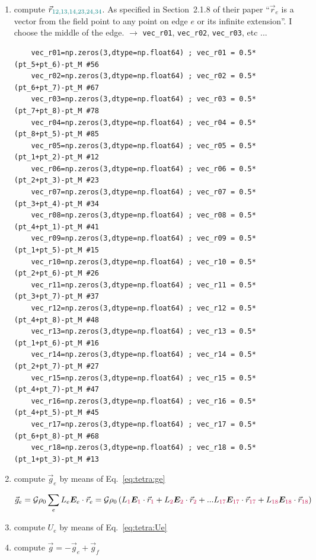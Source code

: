 \begin{enumerate}
\item compute $\vec{r}_{\color{teal}12,13,14,23,24,34}$. As specified in Section~2.1.8 of their
paper ``$\vec{r}_e$ is a vector from the field point to any point on edge $e$ or its infinite extension''. I choose the middle of the edge. $\rightarrow$ \verb|vec_r01|, \verb|vec_r02|, \verb|vec_r03|, etc ...
{\tiny
\begin{lstlisting}
    vec_r01=np.zeros(3,dtype=np.float64) ; vec_r01 = 0.5*(pt_5+pt_6)-pt_M #56 
    vec_r02=np.zeros(3,dtype=np.float64) ; vec_r02 = 0.5*(pt_6+pt_7)-pt_M #67
    vec_r03=np.zeros(3,dtype=np.float64) ; vec_r03 = 0.5*(pt_7+pt_8)-pt_M #78
    vec_r04=np.zeros(3,dtype=np.float64) ; vec_r04 = 0.5*(pt_8+pt_5)-pt_M #85
    vec_r05=np.zeros(3,dtype=np.float64) ; vec_r05 = 0.5*(pt_1+pt_2)-pt_M #12
    vec_r06=np.zeros(3,dtype=np.float64) ; vec_r06 = 0.5*(pt_2+pt_3)-pt_M #23
    vec_r07=np.zeros(3,dtype=np.float64) ; vec_r07 = 0.5*(pt_3+pt_4)-pt_M #34
    vec_r08=np.zeros(3,dtype=np.float64) ; vec_r08 = 0.5*(pt_4+pt_1)-pt_M #41
    vec_r09=np.zeros(3,dtype=np.float64) ; vec_r09 = 0.5*(pt_1+pt_5)-pt_M #15
    vec_r10=np.zeros(3,dtype=np.float64) ; vec_r10 = 0.5*(pt_2+pt_6)-pt_M #26
    vec_r11=np.zeros(3,dtype=np.float64) ; vec_r11 = 0.5*(pt_3+pt_7)-pt_M #37
    vec_r12=np.zeros(3,dtype=np.float64) ; vec_r12 = 0.5*(pt_4+pt_8)-pt_M #48
    vec_r13=np.zeros(3,dtype=np.float64) ; vec_r13 = 0.5*(pt_1+pt_6)-pt_M #16
    vec_r14=np.zeros(3,dtype=np.float64) ; vec_r14 = 0.5*(pt_2+pt_7)-pt_M #27
    vec_r15=np.zeros(3,dtype=np.float64) ; vec_r15 = 0.5*(pt_4+pt_7)-pt_M #47
    vec_r16=np.zeros(3,dtype=np.float64) ; vec_r16 = 0.5*(pt_4+pt_5)-pt_M #45
    vec_r17=np.zeros(3,dtype=np.float64) ; vec_r17 = 0.5*(pt_6+pt_8)-pt_M #68
    vec_r18=np.zeros(3,dtype=np.float64) ; vec_r18 = 0.5*(pt_1+pt_3)-pt_M #13
\end{lstlisting}
}




\item compute $\vec{g}_e$ by means of Eq.~\eqref{eq:tetra:ge}

\[
\vec{g}_e 
={\cal G} \rho_0 \sum_e L_e {\bm E}_e \cdot \vec{r}_e 
={\cal G} \rho_0 \left( 
L_{\color{purple}1} {\bm E}_{\color{purple}1}\cdot\vec{r}_{\color{purple}1} +
L_{\color{purple}2} {\bm E}_{\color{purple}2}\cdot\vec{r}_{\color{purple}2} +
...
L_{\color{purple}17} {\bm E}_{\color{purple}17}\cdot\vec{r}_{\color{purple}17} +
L_{\color{purple}18} {\bm E}_{\color{purple}18}\cdot\vec{r}_{\color{purple}18} 
\right)
\]


\item compute $U_e$ by means of Eq.~\eqref{eq:tetra:Ue}


\item compute $\vec{g}=-\vec{g}_e+\vec{g}_f$

\end{enumerate}



